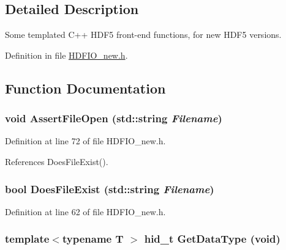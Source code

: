 \subsection{Detailed Description}
Some templated C++ HDF5 front-\/end functions, for new HDF5 versions. 

Definition in file \hyperlink{HDFIO__new_8h_source}{HDFIO\_\-new.h}.



\subsection{Function Documentation}
\subsubsection[{AssertFileOpen}]{\setlength{\rightskip}{0pt plus 5cm}void AssertFileOpen (std::string {\em Filename})}\label{HDFIO__new_8h_a11e198795c8dc7e0753daa6b57083645}


Definition at line 72 of file HDFIO\_\-new.h.



References DoesFileExist().

\subsubsection[{DoesFileExist}]{\setlength{\rightskip}{0pt plus 5cm}bool DoesFileExist (std::string {\em Filename})}\label{HDFIO__new_8h_a5c60b85cf0c953cb2868ba5e01e66771}


Definition at line 62 of file HDFIO\_\-new.h.

\subsubsection[{GetDataType}]{\setlength{\rightskip}{0pt plus 5cm}template$<$typename T $>$ hid\_\-t GetDataType (void)}\label{HDFIO__new_8h_ae29c5c82995b302af2502eb19bb78490}


